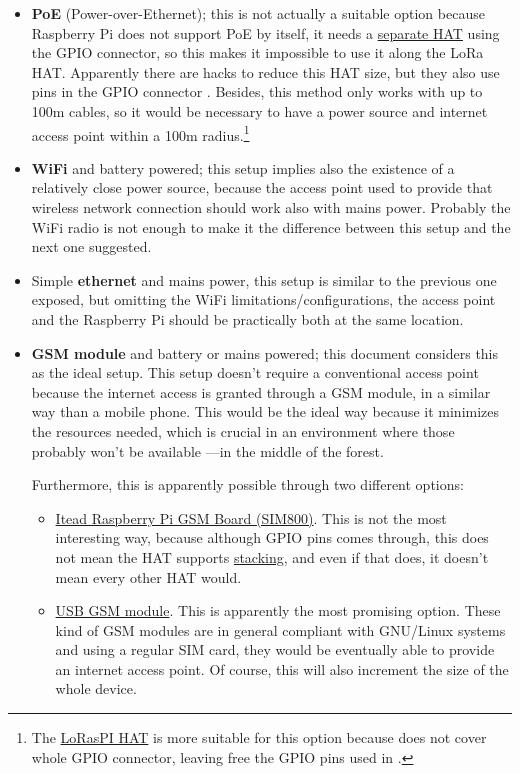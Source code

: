 \documentclass[11pt,a4paper,dvipsnames,twoside]{article}
\begin{document}
\begin{itemize}
  \item \textbf{PoE} (Power-over-Ethernet); this is not actually a suitable option because Raspberry Pi does not support PoE by itself, it needs a \href{https://www.raspberrypi.org/products/poe-hat/}{separate HAT} using the GPIO connector, so this makes it impossible to use it along the LoRa HAT. Apparently there are hacks to reduce this HAT size, but they also use pins in the GPIO connector \cite{RaspiPoEHack}. Besides, this method only works with up to 100m cables, so it would be necessary to have a power source and internet access point within a 100m radius.\footnote{The \href{https://github.com/hallard/LoRasPI}{LoRasPI HAT} is more suitable for this option because does not cover whole GPIO connector, leaving free the GPIO pins used in \cite{RaspiPoEHack}.}
  \item \textbf{WiFi} and battery powered; this setup implies also the existence of a relatively close power source, because the access point used to provide that wireless network connection should work also with mains power. Probably the WiFi radio is not enough to make it the difference between this setup and the next one suggested.
  \item Simple \textbf{ethernet} and mains power, this setup is similar to the previous one exposed, but omitting the WiFi limitations/configurations, the access point and the Raspberry Pi should be practically both at the same location.
  \item \textbf{GSM module} and battery or mains powered; this document considers this as the ideal setup. This setup doesn't require a conventional access point because the internet access is granted through a GSM module, in a similar way than a mobile phone. This would be the ideal way because it minimizes the resources needed, which is crucial in an environment where those probably won't be available ---in the middle of the forest.
  
  Furthermore, this is apparently possible through two different options:
    \begin{itemize}
      \item \href{https://www.itead.cc/wiki/RPI_SIM800_GSM/GPRS_ADD-ON_V2.0}{Itead Raspberry Pi GSM Board (SIM800)}. This is not the most interesting way, because although GPIO pins comes through, this does not mean the HAT supports \href{http://www.pi-in-the-sky.com/index.php?id=stacking-guide}{stacking}, and even if that does, it doesn't mean every other HAT would.
      \item \href{https://tutorials-raspberrypi.com/raspberry-pi-gsm-module-mobile-internet-lte-3g-umts/}{USB GSM module}. This is apparently the most promising option. These kind of GSM modules are in general compliant with GNU/Linux systems and using a regular SIM card, they would be eventually able to provide an internet access point. Of course, this will also increment the size of the whole device.
    \end{itemize}
\end{itemize}
\end{document}

